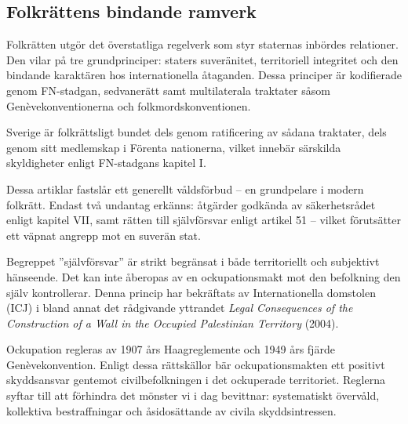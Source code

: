 
\subsection{Folkrättens bindande ramverk}

Folkrätten utgör det överstatliga regelverk som styr staternas inbördes relationer. Den vilar på tre grundprinciper: staters suveränitet, territoriell integritet och den bindande karaktären hos internationella åtaganden. Dessa principer är kodifierade genom FN-stadgan, sedvanerätt samt multilaterala traktater såsom Genèvekonventionerna och folkmordskonventionen.

Sverige är folkrättsligt bundet dels genom ratificering av sådana traktater, dels genom sitt medlemskap i Förenta nationerna, vilket innebär särskilda skyldigheter enligt FN-stadgans kapitel I.



Dessa artiklar fastslår ett generellt våldsförbud – en grundpelare i modern folkrätt. Endast två undantag erkänns: åtgärder godkända av säkerhetsrådet enligt kapitel VII, samt rätten till självförsvar enligt artikel 51 – vilket förutsätter ett väpnat angrepp mot en suverän stat.


Begreppet ”självförsvar” är strikt begränsat i både territoriellt och subjektivt hänseende. Det kan inte åberopas av en ockupationsmakt mot den befolkning den själv kontrollerar. Denna princip har bekräftats av Internationella domstolen (ICJ) i bland annat det rådgivande yttrandet \textit{Legal Consequences of the Construction of a Wall in the Occupied Palestinian Territory} (2004).

\medskip

Ockupation regleras av 1907 års Haagreglemente och 1949 års fjärde Genèvekonvention. Enligt dessa rättskällor bär ockupationsmakten ett positivt skyddsansvar gentemot civilbefolkningen i det ockuperade territoriet. Reglerna syftar till att förhindra det mönster vi i dag bevittnar: systematiskt övervåld, kollektiva bestraffningar och åsidosättande av civila skyddsintressen.

